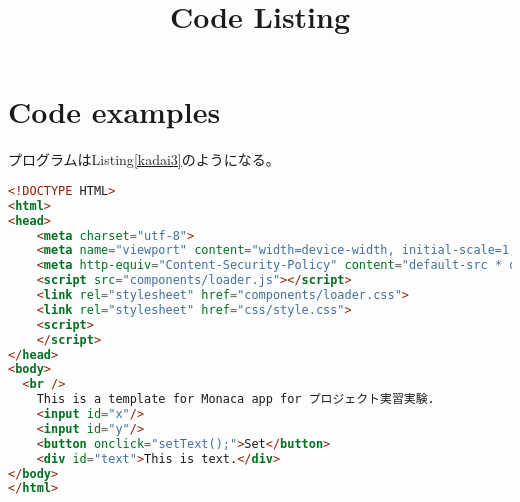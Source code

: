 \documentclass{jarticle}
\title{Code Listing}
\date{ }
\begin{document}
\maketitle

\section{Code examples}

プログラムはListing\ref{kadai3}のようになる。
\begin{lstlisting}[language=HTML, caption=HTMLのプログラム例,label=kadai3]
<!DOCTYPE HTML>
<html>
<head>
    <meta charset="utf-8">
    <meta name="viewport" content="width=device-width, initial-scale=1, maximum-scale=1, user-scalable=no">
    <meta http-equiv="Content-Security-Policy" content="default-src * data: gap: content: https://ssl.gstatic.com; style-src * 'unsafe-inline'; script-src * 'unsafe-inline' 'unsafe-eval'">
    <script src="components/loader.js"></script>
    <link rel="stylesheet" href="components/loader.css">
    <link rel="stylesheet" href="css/style.css">
    <script>
    </script>
</head>
<body>
  <br />
    This is a template for Monaca app for プロジェクト実習実験.
    <input id="x"/>
    <input id="y"/>
    <button onclick="setText();">Set</button>
    <div id="text">This is text.</div>
</body>
</html>
\end{lstlisting}

\end{document}
